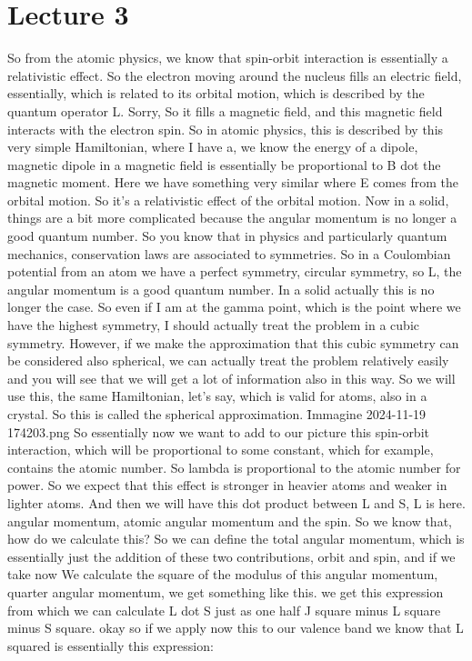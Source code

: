 \chapter{Lecture 3}
So from the atomic physics, we know that spin-orbit interaction is essentially a relativistic effect. So the electron moving around the nucleus fills an electric field, essentially, which is related to its orbital motion, which is described by the quantum operator L. Sorry, So it fills a magnetic field, and this magnetic field interacts with the electron spin. So in atomic physics, this is described by this very simple Hamiltonian, where I have a, we know the energy of a dipole, magnetic dipole in a magnetic field is essentially be proportional to B dot the magnetic moment. Here we have something very similar where E comes from the orbital motion. So it's a relativistic effect of the orbital motion. Now in a solid, things are a bit more complicated because the angular momentum is no longer a good quantum number. So you know that in physics and particularly quantum mechanics, conservation laws are associated to symmetries. So in a Coulombian potential from an atom we have a perfect symmetry, circular symmetry, so L, the angular momentum is a good quantum number. In a solid actually this is no longer the case. So even if I am at the gamma point, which is the point where we have the highest symmetry, I should actually treat the problem in a cubic symmetry. However, if we make the approximation that this cubic symmetry can be considered also spherical, we can actually treat the problem relatively easily and you will see that we will get a lot of information also in this way. So we will use this, the same Hamiltonian, let's say, which is valid for atoms, also in a crystal. So this is called the spherical approximation.
\f{Immagine 2024-11-19 174203.png}
So essentially now we want to add to our picture this spin-orbit interaction, which will be proportional to some constant, which for example, contains the atomic number. So lambda is proportional to the atomic number for power. So we expect that this effect is stronger in heavier atoms and weaker in lighter atoms. And then we will have this dot product between L and S, L is here. angular momentum, atomic angular momentum and the spin. So we know that, how do we calculate this? So we can define the total angular momentum, which is essentially just the addition of these two contributions, orbit and spin, and if we take now We calculate the square of the modulus of this angular momentum, quarter angular momentum, we get something like this. we get this expression from which we can calculate L dot S just as one half J square minus L square minus S square. okay so if we apply now this to our valence band we know that L squared is essentially this expression:

